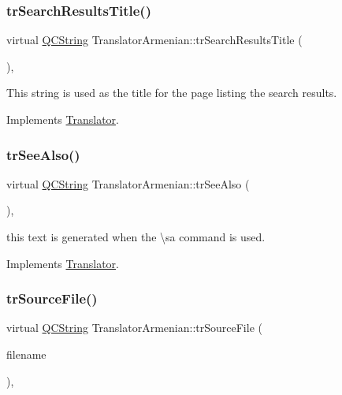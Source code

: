 \subsubsection{\texorpdfstring{trSearchResultsTitle()}{trSearchResultsTitle()}}
{\footnotesize\ttfamily virtual \mbox{\hyperlink{class_q_c_string}{Q\+C\+String}} Translator\+Armenian\+::tr\+Search\+Results\+Title (\begin{DoxyParamCaption}{ }\end{DoxyParamCaption})\hspace{0.3cm}{\ttfamily [inline]}, {\ttfamily [virtual]}}

This string is used as the title for the page listing the search results. 

Implements \mbox{\hyperlink{class_translator}{Translator}}.

\mbox{\label{class_translator_armenian_a53fdaa0cb52e559d994ced8db6254a53}} 
\subsubsection{\texorpdfstring{trSeeAlso()}{trSeeAlso()}}
{\footnotesize\ttfamily virtual \mbox{\hyperlink{class_q_c_string}{Q\+C\+String}} Translator\+Armenian\+::tr\+See\+Also (\begin{DoxyParamCaption}{ }\end{DoxyParamCaption})\hspace{0.3cm}{\ttfamily [inline]}, {\ttfamily [virtual]}}

this text is generated when the \textbackslash{}sa command is used. 

Implements \mbox{\hyperlink{class_translator}{Translator}}.

\mbox{\label{class_translator_armenian_a40087dcf67f4588117b40a81243aa2ad}} 
\subsubsection{\texorpdfstring{trSourceFile()}{trSourceFile()}}
{\footnotesize\ttfamily virtual \mbox{\hyperlink{class_q_c_string}{Q\+C\+String}} Translator\+Armenian\+::tr\+Source\+File (\begin{DoxyParamCaption}\item[{\mbox{\hyperlink{class_q_c_string}{Q\+C\+String}} \&}]{filename }\end{DoxyParamCaption})\hspace{0.3cm}{\ttfamily [inline]}, {\ttfamily [virtual]}}

